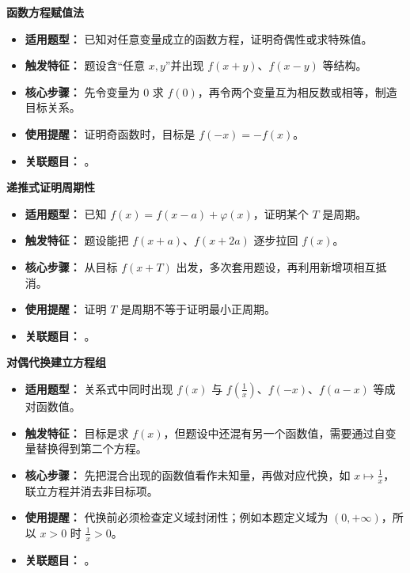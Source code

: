 \begin{knowledgeBox}
\textbf{函数方程赋值法}

\begin{itemize}
  \item \textbf{适用题型：} 已知对任意变量成立的函数方程，证明奇偶性或求特殊值。
  \item \textbf{触发特征：} 题设含“任意 \(x,y\)”并出现 \(f(x+y)\)、\(f(x-y)\) 等结构。
  \item \textbf{核心步骤：} 先令变量为 \(0\) 求 \(f(0)\)，再令两个变量互为相反数或相等，制造目标关系。
  \item \textbf{使用提醒：} 证明奇函数时，目标是 \(f(-x)=-f(x)\)。
  \item \textbf{关联题目：} 。
\end{itemize}

\textbf{递推式证明周期性}

\begin{itemize}
  \item \textbf{适用题型：} 已知 \(f(x)=f(x-a)+\varphi(x)\)，证明某个 \(T\) 是周期。
  \item \textbf{触发特征：} 题设能把 \(f(x+a)\)、\(f(x+2a)\) 逐步拉回 \(f(x)\)。
  \item \textbf{核心步骤：} 从目标 \(f(x+T)\) 出发，多次套用题设，再利用新增项相互抵消。
  \item \textbf{使用提醒：} 证明 \(T\) 是周期不等于证明最小正周期。
  \item \textbf{关联题目：} 。
\end{itemize}

\textbf{对偶代换建立方程组}

\begin{itemize}
  \item \textbf{适用题型：} 关系式中同时出现 \(f(x)\) 与 \(f\left(\frac{1}{x}\right)\)、\(f(-x)\)、\(f(a-x)\) 等成对函数值。
  \item \textbf{触发特征：} 目标是求 \(f(x)\)，但题设中还混有另一个函数值，需要通过自变量替换得到第二个方程。
  \item \textbf{核心步骤：} 先把混合出现的函数值看作未知量，再做对应代换，如 \(x\mapsto \frac{1}{x}\)，联立方程并消去非目标项。
  \item \textbf{使用提醒：} 代换前必须检查定义域封闭性；例如本题定义域为 \((0,+\infty)\)，所以 \(x>0\) 时 \(\frac{1}{x}>0\)。
  \item \textbf{关联题目：} 。
\end{itemize}


\end{knowledgeBox}
